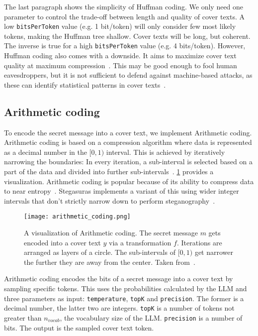 The last paragraph shows the simplicity of Huffman coding. We only need one parameter to control the trade-off between length and quality of cover texts. A low \lstinline|bitsPerToken| value (e.g. 1 bit/token) will only consider few most likely tokens, making the Huffman tree shallow. Cover texts will be long, but coherent. The inverse is true for a high \lstinline|bitsPerToken| value (e.g. 4 bits/token). However, Huffman coding also comes with a downside. It aims to maximize cover text quality at maximum compression~\cite{zieglerNeuralLinguisticSteganography2019}. This may be good enough to fool human eavesdroppers, but it is not sufficient to defend against machine-based attacks, as these can identify statistical patterns in cover texts~\cite{zieglerNeuralLinguisticSteganography2019}.

\subsection{Arithmetic coding}
\label{sec:arithmeticCoding}
To encode the secret message into a cover text, we implement Arithmetic coding. Arithmetic coding is based on a compression algorithm where data is represented as a decimal number in the $ [0, 1) $ interval. This is achieved by iteratively narrowing the boundaries: In every iteration, a sub-interval is selected based on a part of the data and divided into further sub-intervals~\cite{rissanenArithmeticCoding1979}. \cref{fig:arithmeticCoding} provides a visualization. Arithmetic coding is popular because of its ability to compress data to near entropy~\cite{rissanenArithmeticCoding1979}. Stegasuras implements a variant of this using wider integer intervals that don't strictly narrow down to perform steganography~\cite{zieglerNeuralLinguisticSteganography2019,rubinArithmeticStreamCoding1979}.

\begin{figure}
    \centering
    \captionsetup{width=\linewidth}
    \texttt{[image: arithmetic\_coding.png]}
    \caption[Arithmetic coding]{A visualization of Arithmetic coding. The secret message $m$ gets encoded into a cover text $y$ via a transformation $f$. Iterations are arranged as layers of a circle. The sub-intervals of $ [0, 1) $ get narrower the further they are away from the center. Taken from~\cite{zieglerNeuralLinguisticSteganography2019}.}
    \label{fig:arithmeticCoding}
\end{figure}

Arithmetic coding encodes the bits of a secret message into a cover text by sampling specific tokens. This uses the probabilities calculated by the \gls{LLM} and three parameters as input: \lstinline|temperature|, \lstinline|topK| and \lstinline|precision|. The former is a decimal number, the latter two are integers. \lstinline|topK| is a number of tokens not greater than $ n_{vocab} $, the vocabulary size of the \gls{LLM}. \lstinline|precision| is a number of bits. The output is the sampled cover text token.

